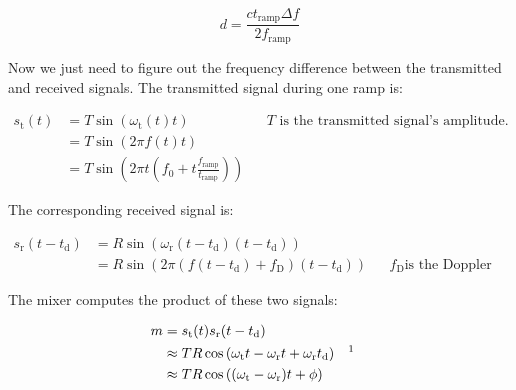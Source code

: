 \begin{equation}
        \label{eq:distance-freq}
        d = \frac{c t_{\text{ramp}} \Delta f}{2 f_{\text{ramp}}}
\end{equation}

Now we just need to figure out the frequency difference between the transmitted and received
signals. The transmitted signal during one ramp is:

\begin{align}
  s_{\text{t}}(t) &= T \sin\left(\omega_{\text{t}}(t) t\right)  && \text{$T$ is the transmitted
                                                                   signal's amplitude.} \\
                  &= T \sin\left(2 \pi f(t) t\right) \\
                  &= T \sin\left(2 \pi t \left( f_0 + t \frac{f_{\text{ramp}}}{t_{\text{ramp}}}
                    \right) \right)
\end{align}

The corresponding received signal is:

\begin{align}
  s_{\text{r}}(t-t_{\text{d}}) &= R \sin \left(\omega_{\text{r}}(t-t_{\text{d}})
                                 (t-t_{\text{d}})\right) \\
                               &= R \sin \left(2 \pi \left(f(t-t_{\text{d}}) +
                                 f_{\text{D}}\right)(t-t_{\text{d}})\right) && \text{$f_{\text{D}}$
                                                                               is the Doppler
                                                                               shift.}
\end{align}

The mixer computes the product of these two signals:

\begin{align}
  m &= s_{\text{t}}(t) s_{\text{r}}(t-t_{\text{d}}) \\
    &\approx T R \cos \left( \omega_{\text{t}}t - \omega_{\text{r}}t + \omega_{\text{r}}t_{\text{d}}
      \right) && \text{\footnotemark} \\
    &\approx T R \cos \left( (\omega_{\text{t}} - \omega_{\text{r}})t + \phi \right)
\end{align}


